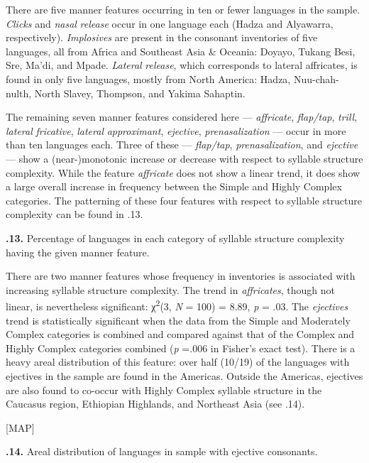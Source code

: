   There are five manner features occurring in ten or fewer languages in the sample. \textit{Clicks} and \textit{nasal} \textit{release} occur in one language each (Hadza and Alyawarra, respectively). \textit{Implosives} are present in the consonant inventories of five languages, all from Africa and Southeast Asia \& Oceania: Doyayo, Tukang Besi, Sre, Ma’di, and Mpade. \textit{Lateral} \textit{release}, which corresponds to lateral affricates, is found in only five languages, mostly from North America: Hadza, Nuu-chah-nulth, North Slavey, Thompson, and Yakima Sahaptin.

  The remaining seven manner features considered here — \textit{affricate}, \textit{flap/tap}, \textit{trill}, \textit{lateral} \textit{fricative}, \textit{lateral} \textit{approximant}, \textit{ejective}, \textit{prenasalization} — occur in more than ten languages each. Three of these —  \textit{flap/tap}, \textit{prenasalization}, and \textit{ejective} — show a (near-)monotonic increase or decrease with respect to syllable structure complexity. While the feature \textit{affricate} does not show a linear trend, it does show a large overall increase in frequency between the Simple and Highly Complex categories. The patterning of these four features with respect to syllable structure complexity can be found in .13.

\textbf{.13.} Percentage of languages in each category of syllable structure complexity having the given manner feature.

  There are two manner features whose frequency in inventories is associated with increasing syllable structure complexity. The trend in \textit{affricates}, though not linear, is nevertheless significant: χ\textsuperscript{2}(3, \textit{N} = 100) = 8.89, \textit{p} = .03. The \textit{ejectives} trend is statistically significant when the data from the Simple and Moderately Complex categories is combined and compared against that of the Complex and Highly Complex categories combined (\textit{p} =.006 in Fisher’s exact test). There is a heavy areal distribution of this feature: over half (10/19) of the languages with ejectives in the sample are found in the Americas. Outside the Americas, ejectives are also found to co-occur with Highly Complex syllable structure in the Caucasus region, Ethiopian Highlands, and Northeast Asia (see .14).

[MAP]

\textbf{.14.} Areal distribution of languages in sample with ejective consonants.

